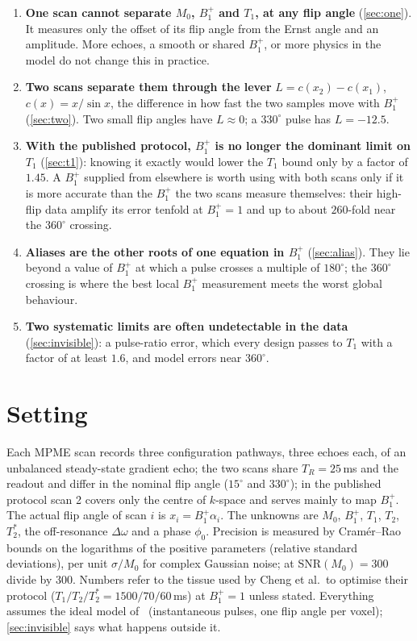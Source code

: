 \documentclass[11pt]{article}
\newcommand{\Bone}{B_1^{+}}
\newcommand{\Tone}{T_1}
\newcommand{\Ttwo}{T_2}
\newcommand{\Ttwos}{T_2^{*}}
\newcommand{\Mzero}{M_0}
\newcommand{\TR}{T_R}
\newcommand{\dw}{\Delta\omega}
\begin{document}
\begin{enumerate}
\item \textbf{One scan cannot separate $\Mzero$, $\Bone$ and $\Tone$, at any flip angle} (\cref{sec:one}). It
  measures only the offset of its flip angle from the Ernst angle and an amplitude. More echoes,
  a smooth or shared $\Bone$, or more physics in the model do not change this in practice.
\item \textbf{Two scans separate them through the lever} $L=c(x_2)-c(x_1)$, $c(x)=x/\sin x$, the
  difference in how fast the two samples move with $\Bone$ (\cref{sec:two}). Two small flip
  angles have $L\approx0$; a $330^\circ$ pulse has $L=-12.5$.
\item \textbf{With the published protocol, $\Bone$ is no longer the dominant limit on $\Tone$} (\cref{sec:t1}):
  knowing it exactly would lower the $\Tone$ bound only by a factor of $1.45$. A $\Bone$ supplied from
  elsewhere is worth using with both scans only if it is more accurate than the $\Bone$ the two scans
  measure themselves: their high-flip data amplify its error tenfold at $\Bone=1$ and up to about
  $260$-fold near the $360^\circ$ crossing.
\item \textbf{Aliases are the other roots of one equation in $\Bone$} (\cref{sec:alias}). They lie beyond
  a value of $\Bone$ at which a pulse crosses a multiple of $180^\circ$; the $360^\circ$ crossing is where the best
  local $\Bone$ measurement meets the worst global behaviour.
\item \textbf{Two systematic limits are often undetectable in the data} (\cref{sec:invisible}): a
  pulse-ratio error, which every design passes to $\Tone$ with a factor of at least $1.6$, and model
  errors near $360^\circ$.
\end{enumerate}

\section{Setting}\label{sec:setting}

Each MPME scan records three configuration pathways, three echoes each, of an unbalanced
steady-state gradient echo; the two scans share $\TR=25$\,ms and the readout and differ in the
nominal flip angle ($15^\circ$ and $330^\circ$); in the published protocol scan 2 covers only the centre of
$k$-space and serves mainly to map $\Bone$. The actual flip angle of scan $i$ is $x_i=\Bone\alpha_i$. The unknowns
are $\Mzero$, $\Bone$, $\Tone$, $\Ttwo$, $\Ttwos$, the off-resonance $\dw$ and a phase $\phi_0$. Precision is measured by
Cram\'er--Rao bounds on the logarithms of the positive parameters (relative standard deviations),
per unit $\sigma/\Mzero$ for complex Gaussian noise; at SNR$(\Mzero)=300$ divide by 300. Numbers refer to the
tissue used by Cheng et al.\ to optimise their protocol ($\Tone/\Ttwo/\Ttwos=1500/70/60$\,ms) at $\Bone=1$ unless
stated. Everything assumes the ideal model of~\cite[Sec.~2]{technote} (instantaneous pulses, one
flip angle per voxel); \cref{sec:invisible} says what happens outside it.
\end{document}
